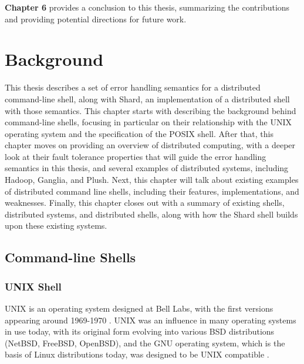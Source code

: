 \documentclass[twoside]{report}
\begin{document}
\textbf{Chapter 6} provides a conclusion to this thesis, summarizing the contributions and providing potential directions for future work.


\chapter{Background}

This thesis describes a set of error handling semantics for a distributed command-line shell, along with Shard, an implementation of a distributed shell with those semantics.
This chapter starts with describing the background behind command-line shells, focusing in particular on their relationship with the UNIX operating system and the specification of the POSIX shell.
After that, this chapter moves on providing an overview of distributed computing, with a deeper look at their fault tolerance properties that will guide the error handling semantics in this thesis, and several examples of distributed systems, including Hadoop, Ganglia, and Plush.
Next, this chapter will talk about existing examples of distributed command line shells, including their features, implementations, and weaknesses.
Finally, this chapter closes out with a summary of existing shells, distributed systems, and distributed shells, along with how the Shard shell builds upon these existing systems.

\section{Command-line Shells}
\subsection{UNIX Shell}
UNIX is an operating system designed at Bell Labs, with the first versions appearing around 1969-1970 \cite{10.1145/361011.361061}.
UNIX was an influence in many operating systems in use today, with its original form evolving into various BSD distributions (NetBSD, FreeBSD, OpenBSD), and the GNU operating system, which is the basis of Linux distributions today, was designed to be UNIX compatible \cite{bretthauer2001open}.
\end{document}
